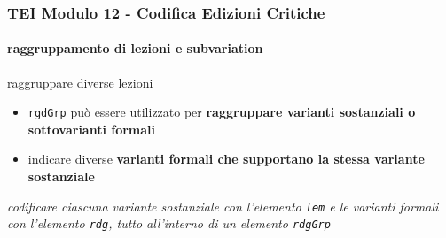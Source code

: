 \begin{frame}
    \frametitle{TEI Modulo 12 - Codifica Edizioni Critiche}
    \framesubtitle{raggruppamento di lezioni e subvariation}
    \addtocounter{nframe}{1}










    \begin{block}{raggruppare diverse lezioni}
        \begin{itemize}
            \item \texttt{rgdGrp} può essere utilizzato per \textbf{raggruppare varianti sostanziali o sottovarianti formali}
            \item indicare diverse \textbf{varianti formali che supportano la stessa variante sostanziale}
        \end{itemize}
    \end{block}

    \textit{codificare ciascuna variante sostanziale con l'elemento \texttt{lem} e le varianti formali con l'elemento \texttt{rdg}, tutto all'interno di un elemento \texttt{rdgGrp}}

\end{frame}



